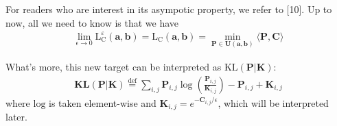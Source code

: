 \documentclass{article}
\begin{document}
\begin{large}
For readers who are interest in its asympotic property, we refer to [10]. Up to now, all we need to know is that we have 
\begin{align}
\lim_{\epsilon\to 0}\mathrm { L } _ { \mathrm { C } } ^ { \varepsilon } ( \mathbf { a } , \mathbf { b } ) = \mathrm { L } _ { \mathrm { C } } ( \mathbf { a } , \mathbf { b } ) = \min _ { \mathbf { P } \in \mathbf { U } ( \mathbf { a } , \mathbf { b } ) } \langle \mathbf { P } , \mathbf { C } \rangle 
\end{align}

What's more, this new target can be interpreted as $\text{KL}(\mathbf{P}|\mathbf{K})$:
\begin{align}
\mathbf { K } \mathbf { L } ( \mathbf { P } | \mathbf { K } ) \stackrel { \mathrm { def }} { = } \sum _ { i , j } \mathbf { P } _ { i , j } \log \left( \frac { \mathbf { P } _ { i , j } } { \mathbf { K } _ { i , j } } \right) - \mathbf { P } _ { i , j } + \mathbf { K } _ { i , j }
\end{align}
where  $\mathrm{log}$ is taken element-wise and $\mathbf { K } _ { i , j } = e^{-\mathbf{C}_{i,j}/\epsilon}$, which will be interpreted later.


\end{large}
\end{document}
